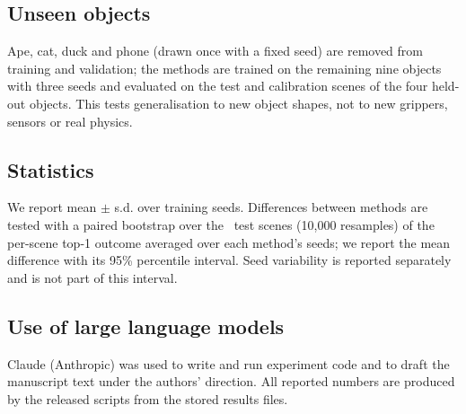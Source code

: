 \subsection{Unseen objects}
Ape, cat, duck and phone (drawn once with a fixed seed) are removed from training and validation; the methods are trained on the remaining nine objects with three seeds and evaluated on the test and calibration scenes of the four held-out objects. This tests generalisation to new object shapes, not to new grippers, sensors or real physics.

\subsection{Statistics}
We report mean $\pm$ s.d. over training seeds. Differences between methods are tested with a paired bootstrap over the \NTest\ test scenes (10,000 resamples) of the per-scene top-1 outcome averaged over each method's seeds; we report the mean difference with its 95\% percentile interval. Seed variability is reported separately and is not part of this interval.

\subsection{Use of large language models}
Claude (Anthropic) was used to write and run experiment code and to draft the manuscript text under the authors' direction. All reported numbers are produced by the released scripts from the stored results files.
